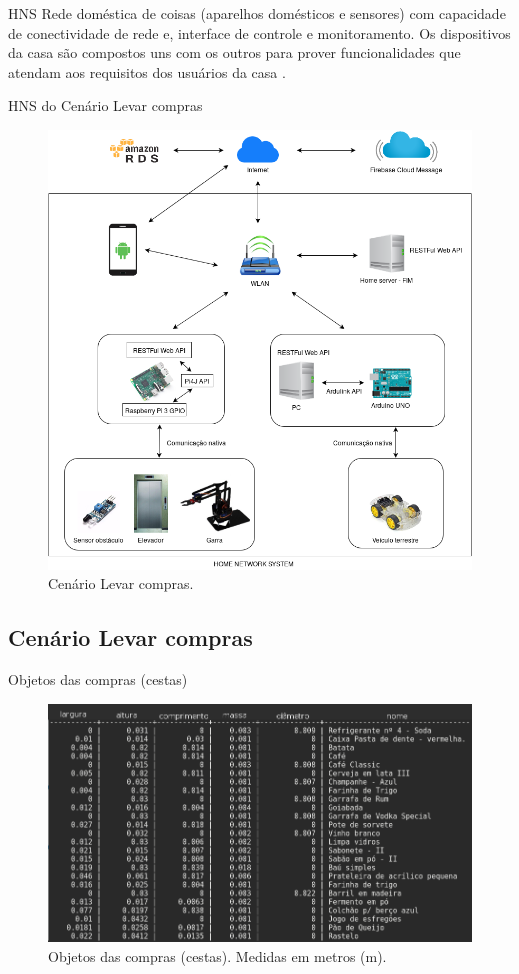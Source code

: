 \documentclass[brazil]{beamer}
\begin{document}
\begin{frame}{HNS}
Rede doméstica de coisas (aparelhos domésticos e sensores) com capacidade de conectividade de rede e, interface de controle e monitoramento. Os dispositivos da casa são compostos uns com os outros para prover funcionalidades que atendam aos requisitos dos usuários da casa \cite{Ikegami:2013}.
\end{frame}

\begin{frame}{HNS do Cenário Levar compras}
\begin{figure}[!htb] \centering 
  \centering
  \includegraphics[width=0.7\columnwidth]{slide/cenario} 
  \caption{Cenário Levar compras.} 
  \label{fig:hns}
\end{figure}
\end{frame}


\subsection{Cenário Levar compras}
\begin{frame}{Objetos das compras (cestas)}
\begin{figure}[!htb] \centering 
  \centering
  \includegraphics[width=0.9\columnwidth]{slide/lista_items} 
  \caption{Objetos das compras (cestas). Medidas em metros (m).} 
  \label{fig:lista_items}
\end{figure}
\end{frame}
\end{document}
